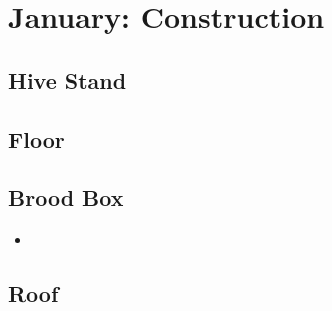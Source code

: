 \section{January: Construction}

\subsection*{Hive Stand}

\subsection*{Floor}

\subsection*{Brood Box}

\begin{itemize}
    \item 

\end{itemize}

\subsection*{Roof}